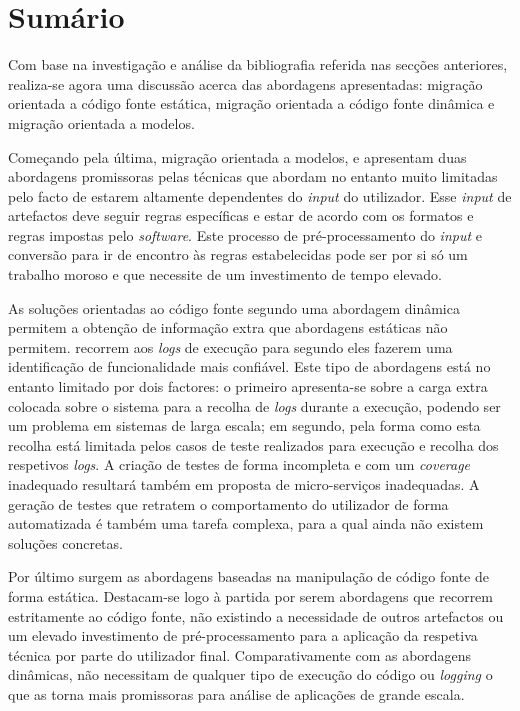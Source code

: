     

\newpage
\section{Sumário}

    Com base na investigação e análise da bibliografia referida nas secções anteriores, realiza-se agora uma discussão acerca das abordagens apresentadas: migração orientada a código fonte estática, migração orientada a código fonte dinâmica e migração orientada a modelos.
    
    Começando pela última, migração orientada a modelos, \cite{gysel16_service_cutter} e \cite{chen17_dataflow_driven} apresentam duas abordagens promissoras pelas técnicas que abordam no entanto muito limitadas pelo facto de estarem altamente dependentes do \textit{input} do utilizador. Esse \textit{input} de artefactos deve seguir regras específicas e estar de acordo com os formatos e regras impostas pelo \textit{software}. Este processo de pré-processamento do \textit{input} e conversão para ir de encontro às regras estabelecidas pode ser por si só um trabalho moroso e que necessite de um investimento de tempo elevado.

    
    As soluções orientadas ao código fonte segundo uma abordagem dinâmica permitem a obtenção de informação extra que abordagens estáticas não permitem. \cite{fome_jin_18} recorrem aos \textit{logs} de execução para segundo eles fazerem uma identificação de funcionalidade mais confiável. Este tipo de abordagens está no entanto limitado por dois factores: o primeiro apresenta-se sobre a carga extra colocada sobre o sistema para a recolha de \textit{logs} durante a execução, podendo ser um problema em sistemas de larga escala; em segundo, pela forma como esta recolha está limitada pelos casos de teste realizados para execução e recolha dos respetivos \textit{logs}. A criação de testes de forma incompleta e com um \textit{coverage} inadequado resultará também em proposta de micro-serviços inadequadas. A geração de testes que retratem o comportamento do utilizador de forma automatizada é também uma tarefa complexa, para a qual ainda não existem soluções concretas.
    
    Por último surgem as abordagens baseadas na manipulação de código fonte de forma estática. Destacam-se logo à partida por serem abordagens que recorrem estritamente ao código fonte, não existindo a necessidade de outros artefactos ou um elevado investimento de pré-processamento para a aplicação da respetiva técnica por parte do utilizador final. Comparativamente com as abordagens dinâmicas, não necessitam de qualquer tipo de execução do código ou \textit{logging} o que as torna mais promissoras para análise de aplicações de grande escala.
    
